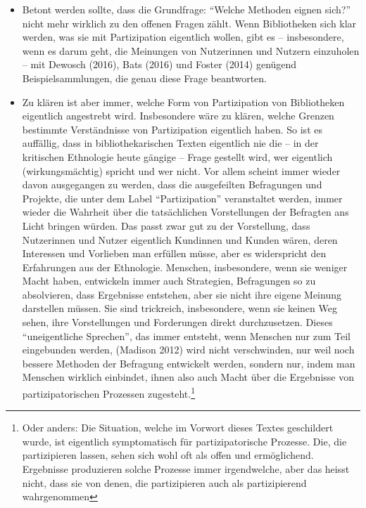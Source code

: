 \documentclass[a4paper,
fontsize=11pt,
oneside,
numbers=noperiodatend,
parskip=half-,
bibliography=totoc,
final
]{scrartcl}
\begin{document}
\begin{itemize}
\item
  Betont werden sollte, dass die Grundfrage: \enquote{Welche Methoden
  eignen sich?} nicht mehr wirklich zu den offenen Fragen zählt. Wenn
  Bibliotheken sich klar werden, was sie mit Partizipation eigentlich
  wollen, gibt es -- insbesondere, wenn es darum geht, die Meinungen von
  Nutzerinnen und Nutzern einzuholen -- mit Dewosch (2016), Bats (2016)
  und Foster (2014) genügend Beispielsammlungen, die genau diese Frage
  beantworten.
\item
  Zu klären ist aber immer, welche Form von Partizipation von
  Bibliotheken eigentlich angestrebt wird. Insbesondere wäre zu klären,
  welche Grenzen bestimmte Verständnisse von Partizipation eigentlich
  haben. So ist es auffällig, dass in bibliothekarischen Texten
  eigentlich nie die -- in der kritischen Ethnologie heute gängige --
  Frage gestellt wird, wer eigentlich (wirkungsmächtig) spricht und wer
  nicht. Vor allem scheint immer wieder davon ausgegangen zu werden,
  dass die ausgefeilten Befragungen und Projekte, die unter dem Label
  \enquote{Partizipation} veranstaltet werden, immer wieder die Wahrheit
  über die tatsächlichen Vorstellungen der Befragten ans Licht bringen
  würden. Das passt zwar gut zu der Vorstellung, dass Nutzerinnen und
  Nutzer eigentlich Kundinnen und Kunden wären, deren Interessen und
  Vorlieben man erfüllen müsse, aber es widerspricht den Erfahrungen aus
  der Ethnologie. Menschen, insbesondere, wenn sie weniger Macht haben,
  entwickeln immer auch Strategien, Befragungen so zu absolvieren, dass
  Ergebnisse entstehen, aber sie nicht ihre eigene Meinung darstellen
  müssen. Sie sind trickreich, insbesondere, wenn sie keinen Weg sehen,
  ihre Vorstellungen und Forderungen direkt durchzusetzen. Dieses
  \enquote{uneigentliche Sprechen}, das immer entsteht, wenn Menschen
  nur zum Teil eingebunden werden, (Madison 2012) wird nicht
  verschwinden, nur weil noch bessere Methoden der Befragung entwickelt
  werden, sondern nur, indem man Menschen wirklich einbindet, ihnen also
  auch Macht über die Ergebnisse von partizipatorischen Prozessen
  zugesteht.\footnote{Oder anders: Die Situation, welche im Vorwort
    dieses Textes geschildert wurde, ist eigentlich symptomatisch für
    partizipatorische Prozesse. Die, die partizipieren lassen, sehen
    sich wohl oft als offen und ermöglichend. Ergebnisse produzieren
    solche Prozesse immer irgendwelche, aber das heisst nicht, dass sie
    von denen, die partizipieren auch als partizipierend wahrgenommen
}
\end{itemize}
\end{document}
